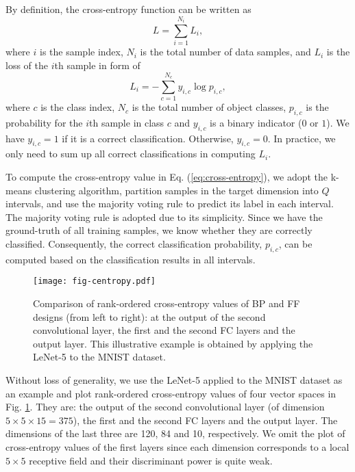 \documentclass[preprint,12pt]{elsarticle}
\begin{document}
By definition, the cross-entropy function can be written as 
\begin{equation}\label{eq:cross-entropy}
L = \sum_{i=1}^{N_i} L_i,
\end{equation}
where $i$ is the sample index, $N_i$ is the total number of data
samples, and $L_i$ is the loss of the $i$th sample in form of
\begin{equation}\label{eq:cross-entropy-i}
L_i = - \sum_{c=1}^{N_c} y_{i,c} \log p_{i,c},
\end{equation}
where $c$ is the class index, $N_c$ is the total number of object
classes, $p_{i,c}$ is the probability for the $i$th sample in class $c$
and $y_{i,c}$ is a binary indicator ($0$ or $1$). We have $y_{i,c}=1$ if
it is a correct classification. Otherwise, $y_{i,c}=0$. In practice, we
only need to sum up all correct classifications in computing $L_i$. 

To compute the cross-entropy value in Eq. (\ref{eq:cross-entropy}), we
adopt the k-means clustering algorithm, partition samples in the target
dimension into $Q$ intervals, and use the majority voting rule to
predict its label in each interval. The majority voting rule is adopted
due to its simplicity.  Since we have the ground-truth of all training
samples, we know whether they are correctly classified. Consequently,
the correct classification probability, $p_{i,c}$, can be computed based
on the classification results in all intervals. 

\begin{figure}[htb]
\centering
\texttt{[image: fig-centropy.pdf]}
\caption{Comparison of rank-ordered cross-entropy values of BP and FF
designs (from left to right): at the output of the second convolutional
layer, the first and the second FC layers and the output layer. This
illustrative example is obtained by applying the LeNet-5 to the MNIST
dataset.}\label{fig:centropy_comparison}
\end{figure}

Without loss of generality, we use the LeNet-5 applied to the MNIST
dataset as an example and plot rank-ordered cross-entropy values of four
vector spaces in Fig. \ref{fig:centropy_comparison}. They are: the
output of the second convolutional layer (of dimension $5 \times 5
\times 15 = 375$), the first and the second FC layers and the output
layer. The dimensions of the last three are 120, 84 and 10,
respectively. We omit the plot of cross-entropy values of the first
layers since each dimension corresponds to a local $5 \times 5$
receptive field and their discriminant power is quite weak. 
\end{document}
